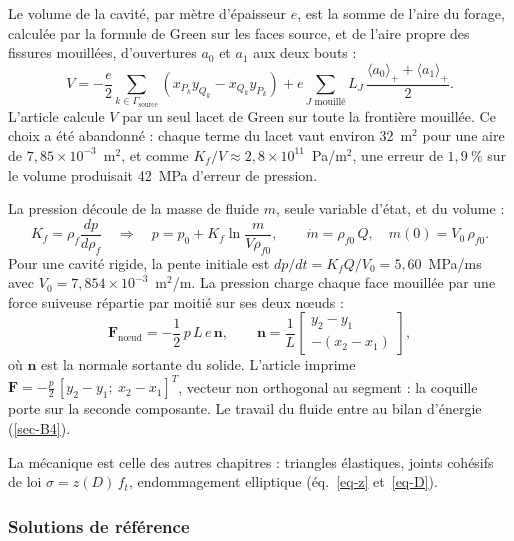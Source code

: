 Le volume de la cavité, par mètre d'épaisseur $e$, est la somme de l'aire du forage, calculée par la formule de Green sur les faces source, et de l'aire propre des fissures mouillées, d'ouvertures $a_0$ et $a_1$ aux deux bouts :
\begin{equation}
V = -\frac{e}{2} \sum_{k \in \Gamma_\text{source}} \left(x_{P_k} y_{Q_k} - x_{Q_k} y_{P_k}\right) + e \sum_{J \text{ mouillé}} L_J\,\frac{\langle a_0\rangle_+ + \langle a_1\rangle_+}{2} .
\label{eq-ab-volume}
\end{equation}
L'article calcule $V$ par un seul lacet de Green sur toute la frontière mouillée. Ce choix a été abandonné : chaque terme du lacet vaut environ 32~m$^2$ pour une aire de $7{,}85\times10^{-3}$~m$^2$, et comme $K_f/V \approx 2{,}8\times10^{11}$~Pa/m$^2$, une erreur de $1{,}9~\%$ sur le volume produisait 42~MPa d'erreur de pression.

La pression découle de la masse de fluide $m$, seule variable d'état, et du volume :
\begin{equation}
K_f = \rho_f \frac{dp}{d\rho_f} \quad \Longrightarrow \quad p = p_0 + K_f \ln\frac{m}{V \rho_{f0}}, \qquad \dot m = \rho_{f0}\,Q, \quad m(0) = V_0\,\rho_{f0} .
\label{eq-ab-pression}
\end{equation}
Pour une cavité rigide, la pente initiale est $dp/dt = K_f Q/V_0 = 5{,}60$~MPa/ms avec $V_0 = 7{,}854\times10^{-3}$~m$^2$/m. La pression charge chaque face mouillée par une force suiveuse répartie par moitié sur ses deux nœuds :
\begin{equation}
\mathbf F_\text{nœud} = -\frac12\,p\,L\,e\,\mathbf n, \qquad \mathbf n = \frac1L \begin{bmatrix} y_2 - y_1 \\ -(x_2 - x_1) \end{bmatrix},
\label{eq-ab-force}
\end{equation}
où $\mathbf n$ est la normale sortante du solide. L'article imprime $\mathbf F = -\tfrac p2\,[y_2 - y_1;\ x_2 - x_1]^T$, vecteur non orthogonal au segment : la coquille porte sur la seconde composante. Le travail du fluide entre au bilan d'énergie (\cref{sec-B4}).

La mécanique est celle des autres chapitres : triangles élastiques, joints cohésifs de loi $\sigma = z(D)\,f_t$, endommagement elliptique (éq.~\ref{eq-z} et~\ref{eq-D}).

\subsubsection{Solutions de référence}

